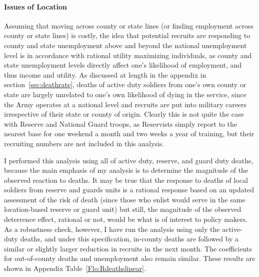 \documentclass[12pt] {article}
\begin{document}


\paragraph{Issues of Location}
Assuming that moving across county or state lines (or finding employment across
county or state lines) is costly, the idea that potential recruits are responding to county and state unemployment above and beyond the national unemployment level is in
accordance with rational utility maximizing individuals, as county and state unemployment
levels directly affect one's likelihood of employment, and thus income
and utility. As discussed at length in the appendix in section~\ref{sec:deathrate}, deaths of active duty soldiers from one's own county or state are largely unrelated to one's own likelihood of dying in the service, since the Army operates at a national level and recruits are put into
military careers irrespective of their state or county of origin. Clearly this is not quite the
case with Reserve and National Guard troops, as Reservists simply
report to the nearest base for one weekend a month and two weeks
a year of training, but their recruiting numbers are not included
in this analysis.


I performed this analysis using all of active duty, reserve, and guard duty deaths, because the main emphasis of my analysis is to determine the magnitude of the observed reaction to deaths. It may be true that the response to deaths of local soldiers from
reserve and guards units is a rational response based on an updated
assessment of the risk of death (since those who enlist would serve in the same location-based reserve or guard unit) but still, the magnitude of the observed
deterrence effect, rational or not, would be what is of interest to
policy makers. As a robustness check, however, I have run the analysis
using only the active-duty deaths, and under this specification, in-county
deaths are followed by a similar or slightly larger reduction in recruits in the
next month. The coefficients for out-of-county deaths and unemployment also
remain similar. These results are shown in Appendix Table~\ref{Flo:Rdeathslinear}. 
\end{document}
